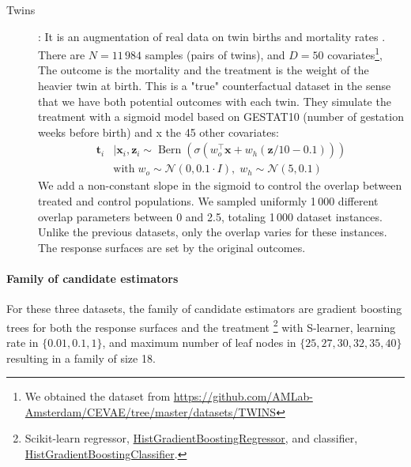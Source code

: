 \documentclass[french,12pt,twoside,a4paper]{book}
\begin{document}
\begin{description}
  \item[Twins] \citep{louizos_causal_2017}: It is an augmentation of
    real data on twin births and mortality rates
    \citep{almond_costs_2005}. There are $N=11\,984$ samples (pairs of twins),
    and $D=50$ covariates\footnote{We obtained the dataset from
      \href{https://github.com/AMLab-Amsterdam/CEVAE/tree/master/datasets/TWINS}{https://github.com/AMLab-Amsterdam/CEVAE/tree/master/datasets/TWINS}}, The outcome is the mortality and the treatment is the
    weight of the heavier twin at birth. This is a "true" counterfactual dataset
    \citep{curth_really_2021} in the sense that we have
    both potential outcomes with each twin. They simulate the treatment with a
    sigmoid model based on GESTAT10 (number of gestation weeks before birth) and x
    the 45 other covariates:
    \begin{align}
      \mathbf{t}_{i} & \mid \mathbf{x}_{i}, \mathbf{z}_{i} \sim
      \operatorname{Bern}\left(\sigma\left(w_{o}^{\top}
      \mathbf{x}+w_{h}(\mathbf{z} / 10-0.1)\right)\right)       \\ & \text{with} \;
      w_{o} \sim \mathcal{N}(0,0.1 \cdot I),\; w_{h} \sim \mathcal{N}(5,0.1) \nonumber
    \end{align}
    We add a non-constant slope in the
    sigmoid to control the overlap between
    treated and control populations.
    We sampled uniformly 1\,000 different overlap parameters between 0 and
    2.5, totaling 1\,000 dataset instances. Unlike the previous datasets,
    only the overlap varies for these instances. The response surfaces are
    set by the original outcomes.
\end{description}

\paragraph{Family of candidate estimators}

For these three datasets, the family of candidate estimators are gradient
boosting trees for both the response surfaces and the treatment
\footnote{Scikit-learn regressor,
  \href{https://scikit-learn.org/stable/modules/generated/sklearn.ensemble.HistGradientBoostingRegressor.html}{HistGradientBoostingRegressor},
  and classifier,
  \href{https://scikit-learn.org/stable/modules/generated/sklearn.ensemble.HistGradientBoostingClassifier.html}{HistGradientBoostingClassifier}.}
with S-learner, learning rate
in $\{0.01, 0.1, 1\}$, and maximum number of leaf nodes in $\{25, 27, 30, 32,
  35, 40\}$ resulting in a family of size 18.
\end{document}
